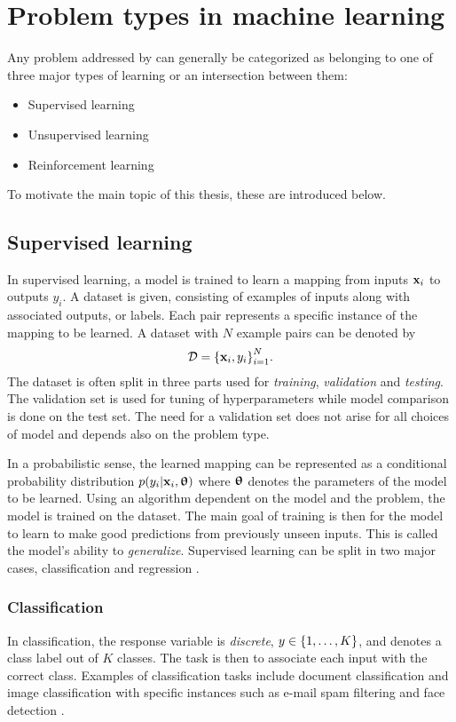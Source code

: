
\section{Problem types in machine learning}
Any problem addressed by  can generally be categorized as belonging to one of three major types of learning or an intersection between them:
\begin{itemize}
    \item Supervised learning
    \item Unsupervised learning
    \item Reinforcement learning
\end{itemize}
To motivate the main topic of this thesis, these are introduced below.

\subsection{Supervised learning}
In supervised learning, a model is trained to learn a mapping from inputs ${\mathbf{x}}_i$ to outputs $y_i$. A dataset is given, consisting of examples of inputs along with associated outputs, or labels. Each pair represents a specific instance of the mapping to be learned. A dataset with $N$ example pairs can be denoted by 
\begin{equation}
    \mathcal{D} = {\left\{{\mathbf{x}}_i,y_i\right\}}_{i=1}^{N}.
\end{equation}
The dataset is often split in three parts used for \textit{training}, \textit{validation} and \textit{testing}. The validation set is used for tuning of hyperparameters while model comparison is done on the test set. The need for a validation set does not arise for all choices of model and depends also on the problem type.

In a probabilistic sense, the learned mapping can be represented as a conditional probability distribution $p(y_i|{\mathbf{x}}_i,{\boldsymbol{\uptheta}})$ where ${\boldsymbol{\uptheta}}$ denotes the parameters of the model to be learned. Using an algorithm dependent on the model and the problem, the model is trained on the dataset. The main goal of training is then for the model to learn to make good predictions from previously unseen inputs. This is called the model's ability to \textit{generalize}. Supervised learning can be split in two major cases, classification and regression \cite{Murphy2012}. 

\subsubsection{Classification}
In classification, the response variable is \textit{discrete},  $y\in{\left\{1,\dots,K\right\}}$, and denotes a class label out of $K$ classes. The task is then to associate each input with the correct class. Examples of classification tasks include document classification and image classification with specific instances such as e-mail spam filtering and face detection \cite{Murphy2012}. 

